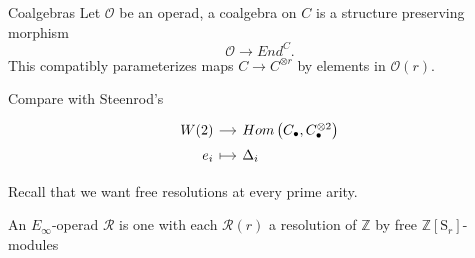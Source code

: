 \documentclass[10pt,t]{beamer}
\renewcommand{\S}{\mathrm{S}}
\begin{document}
\begin{frame}[fragile]{Coalgebras}
	Let $\mathcal O$ be an operad, a coalgebra on $C$ is a structure preserving morphism
	\begin{equation*}
	\mathcal O \to End^C.
	\end{equation*}
	This compatibly parameterizes maps $C \to C^{\otimes r}$ by elements in $\mathcal O(r)$.
	
	\pause \vspace*{10pt}
	
	Compare with Steenrod's
	\vspace*{-2pt}
	\begin{equation*}
	\begin{tikzcd}[%
	row sep=tiny,
	column sep = small,
	,row sep = 0ex
	,/tikz/column 1/.append style={anchor=base east}
	,/tikz/column 2/.append style={anchor=base west}
	]
	W(2) \arrow[r] & Hom\left(C_\bullet, C_\bullet^{\otimes 2}\right) \\
	e_i \arrow[r, |->] & \Delta_i
	\end{tikzcd}
	\end{equation*}
	
	\pause
	Recall that we want free resolutions at every prime arity.

	\pause

	\begin{definition}
		An $E_\infty$-operad $\mathcal R$ is one with each $\mathcal R(r)$ a resolution of $\mathbb Z$ by free $\mathbb Z[\S_r]$-modules
	\end{definition}
\end{frame}
\end{document}
